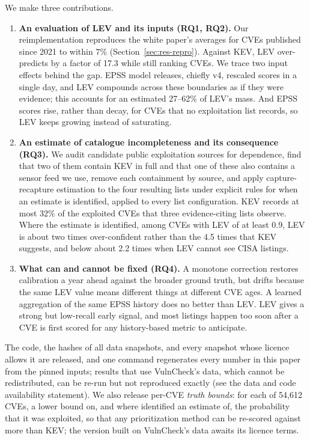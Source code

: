 \noindent We make three contributions.
\begin{enumerate}
\item \textbf{An evaluation of LEV and its inputs (RQ1, RQ2).} Our
reimplementation reproduces the white paper's averages for CVEs published since
2021 to within 7\% (Section~\ref{sec:res-repro}). Against KEV, LEV over-predicts by a factor of 17.3 while still ranking
CVEs. We trace two input effects behind the gap. EPSS model releases, chiefly v4,
rescaled scores in a single day, and LEV compounds across these boundaries as
if they were evidence; this accounts for an estimated 27--62\% of LEV's mass.
And EPSS scores rise, rather than decay, for CVEs that no exploitation list
records, so LEV keeps growing instead of saturating.
\item \textbf{An estimate of catalogue incompleteness and its consequence
(RQ3).} We audit candidate public exploitation sources for dependence, find that two
of them contain KEV in full and that one of these also contains a sensor feed
we use, remove each containment by source, and apply capture-recapture
estimation to the four resulting lists under explicit rules for when an estimate is
identified, applied to every list configuration. KEV records at most 32\% of the exploited CVEs that
three evidence-citing lists observe. Where the estimate is identified, among
CVEs with LEV of at least 0.9, LEV is about two times over-confident rather
than the 4.5 times that KEV suggests, and below about 2.2 times when LEV cannot
see CISA listings.
\item \textbf{What can and cannot be fixed (RQ4).} A monotone correction
restores calibration a year ahead against the broader ground truth, but drifts
because the same LEV value means different things at different CVE ages. A
learned aggregation of the same EPSS history does no better than LEV. LEV gives
a strong but low-recall early signal, and most listings happen too soon after
a CVE is first scored for any history-based metric to anticipate.
\end{enumerate}

The code, the hashes of all data snapshots, and every snapshot whose licence
allows it are released, and one command regenerates
every number in this paper from the pinned inputs; results that use
VulnCheck's data, which cannot be redistributed, can be re-run but not
reproduced exactly (see the data and code availability statement). We also release per-CVE \emph{truth
bounds}: for each of 54,612 CVEs, a lower bound on, and where identified an
estimate of, the probability that it was exploited, so that any prioritization
method can be re-scored against more than KEV; the version built on
VulnCheck's data awaits its licence terms.

